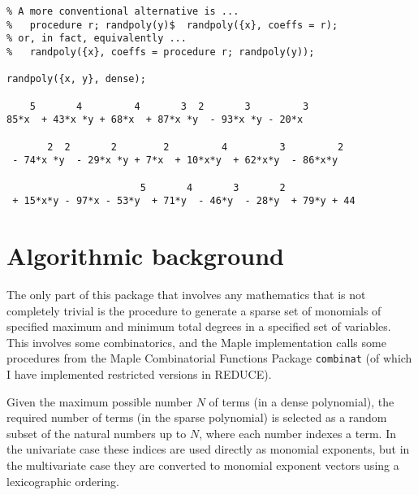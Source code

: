 \begin{verbatim}
% A more conventional alternative is ...
%   procedure r; randpoly(y)$  randpoly({x}, coeffs = r);
% or, in fact, equivalently ...
%   randpoly({x}, coeffs = procedure r; randpoly(y));

randpoly({x, y}, dense);

    5       4         4       3  2       3         3
85*x  + 43*x *y + 68*x  + 87*x *y  - 93*x *y - 20*x

       2  2       2        2         4         3         2
 - 74*x *y  - 29*x *y + 7*x  + 10*x*y  + 62*x*y  - 86*x*y

                       5       4       3       2
 + 15*x*y - 97*x - 53*y  + 71*y  - 46*y  - 28*y  + 79*y + 44
\end{verbatim}


\appendix

\newcommand{\N}{\mbox{\SYM N}}		%

\newcommand{\th}{\mbox{$^{\it th}$}}

\newtheorem{prop}{Proposition}

\newenvironment{proof}%
   {\par\addvspace\baselineskip\noindent{\bf Proof~}}%
   {\hspace*{\fill}$\Box$\par\addvspace\baselineskip}

\section{Algorithmic background}

The only part of this package that involves any mathematics that is
not completely trivial is the procedure to generate a sparse set of
monomials of specified maximum and minimum total degrees in a
specified set of variables.  This involves some combinatorics, and the
Maple implementation calls some procedures from the Maple
Combinatorial Functions Package {\tt combinat} (of which I have
implemented restricted versions in REDUCE).

Given the maximum possible number $N$ of terms (in a dense
polynomial), the required number of terms (in the sparse polynomial)
is selected as a random subset of the natural numbers up to $N$, where
each number indexes a term.  In the univariate case these indices are
used directly as monomial exponents, but in the multivariate case they
are converted to monomial exponent vectors using a lexicographic
ordering.


